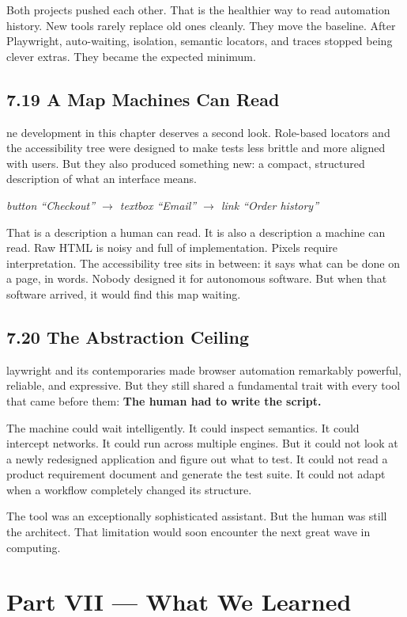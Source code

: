 \documentclass[11pt, a4paper, openany]{book}
\newcommand{\initialcap}[1]{{\fontfamily{lmss}\selectfont\huge\textbf{#1}}}
\begin{document}
Both projects pushed each other. That is the healthier way to read automation history. New tools rarely replace old ones cleanly. They move the baseline. After Playwright, auto-waiting, isolation, semantic locators, and traces stopped being clever extras. They became the expected minimum.

\section{7.19 A Map Machines Can Read}
\noindent \initialcap{O}ne development in this chapter deserves a second look. Role-based locators and the accessibility tree were designed to make tests less brittle and more aligned with users. But they also produced something new: a compact, structured description of what an interface means.
\begin{center}
\textit{button ``Checkout'' $\rightarrow$ textbox ``Email'' $\rightarrow$ link ``Order history''}
\end{center}
That is a description a human can read. It is also a description a machine can read. Raw HTML is noisy and full of implementation. Pixels require interpretation. The accessibility tree sits in between: it says what can be done on a page, in words. Nobody designed it for autonomous software. But when that software arrived, it would find this map waiting.

\section{7.20 The Abstraction Ceiling}
\noindent \initialcap{P}laywright and its contemporaries made browser automation remarkably powerful, reliable, and expressive. But they still shared a fundamental trait with every tool that came before them: \textbf{The human had to write the script.} 

The machine could wait intelligently. It could inspect semantics. It could intercept networks. It could run across multiple engines. But it could not look at a newly redesigned application and figure out what to test. It could not read a product requirement document and generate the test suite. It could not adapt when a workflow completely changed its structure. 

The tool was an exceptionally sophisticated assistant. But the human was still the architect. That limitation would soon encounter the next great wave in computing.

\chapter*{Part VII --- What We Learned}
\end{document}
